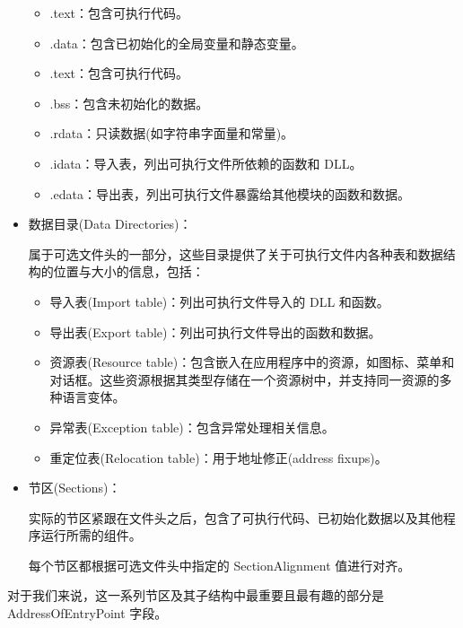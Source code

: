 \begin{itemize}
\begin{itemize}
\item 
.text：包含可执行代码。

\item 
.data：包含已初始化的全局变量和静态变量。

\item 
.text：包含可执行代码。

\item 
.bss：包含未初始化的数据。

\item 
.rdata：只读数据(如字符串字面量和常量)。

\item 
.idata：导入表，列出可执行文件所依赖的函数和 DLL。

\item 
.edata：导出表，列出可执行文件暴露给其他模块的函数和数据。
\end{itemize}

\item 
数据目录(Data Directories)：

属于可选文件头的一部分，这些目录提供了关于可执行文件内各种表和数据结构的位置与大小的信息，包括：

\begin{itemize}
\item 
导入表(Import table)：列出可执行文件导入的 DLL 和函数。

\item 
导出表(Export table)：列出可执行文件导出的函数和数据。

\item 
资源表(Resource table)：包含嵌入在应用程序中的资源，如图标、菜单和对话框。这些资源根据其类型存储在一个资源树中，并支持同一资源的多种语言变体。

\item 
异常表(Exception table)：包含异常处理相关信息。

\item 
重定位表(Relocation table)：用于地址修正(address fixups)。
\end{itemize}

\item 
节区(Sections)：

实际的节区紧跟在文件头之后，包含了可执行代码、已初始化数据以及其他程序运行所需的组件。

每个节区都根据可选文件头中指定的 SectionAlignment 值进行对齐。
\end{itemize}

对于我们来说，这一系列节区及其子结构中最重要且最有趣的部分是 AddressOfEntryPoint 字段。

